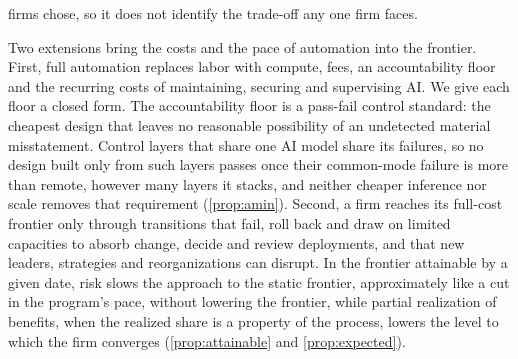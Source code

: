 firms chose, so it does not identify the trade-off any one firm faces.

Two extensions bring the costs and the pace of automation into the frontier. First, full automation replaces labor with compute, fees, an accountability floor and the recurring costs of maintaining, securing and supervising AI. We give each floor a closed form. The accountability floor is a pass-fail control standard: the cheapest design that leaves no reasonable possibility of an undetected material misstatement. Control layers that share one AI model share its failures, so no design built only from such layers passes once their common-mode failure is more than remote, however many layers it stacks, and neither cheaper inference nor scale removes that requirement (\autoref{prop:amin}). Second, a firm reaches its full-cost frontier only through transitions that fail, roll back and draw on limited capacities to absorb change, decide and review deployments, and that new leaders, strategies and reorganizations can disrupt. In the frontier attainable by a given date, risk slows the approach to the static frontier, approximately like a cut in the program's pace, without lowering the frontier, while partial realization of benefits, when the realized share is a property of the process, lowers the level to which the firm converges (\autoref{prop:attainable} and \autoref{prop:expected}).

